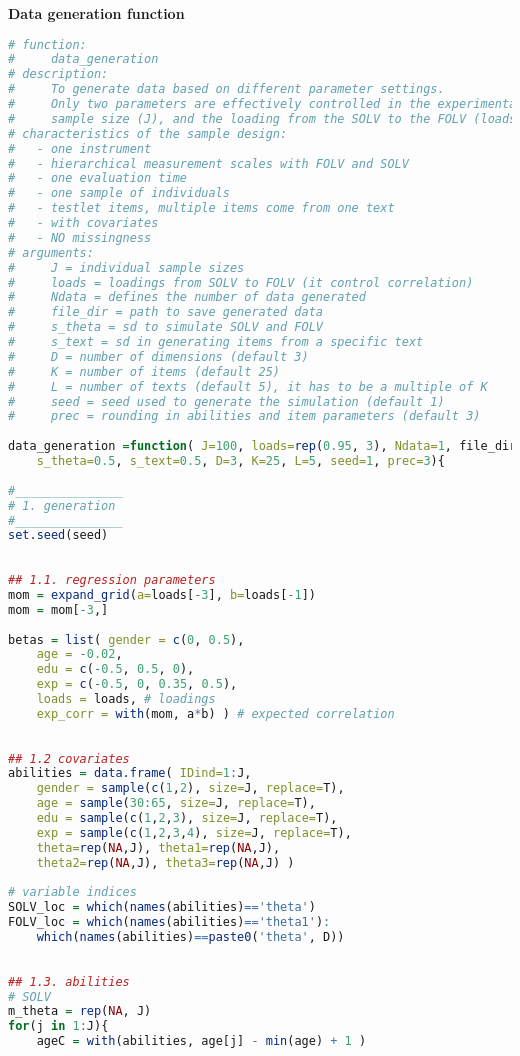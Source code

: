 \noindent \textbf{Data generation function}
%
\begin{lstlisting}[language=R]
# function:
#     data_generation
# description:  
#     To generate data based on different parameter settings.
#     Only two parameters are effectively controlled in the experimentation: 
#     sample size (J), and the loading from the SOLV to the FOLV (loads).
# characteristics of the sample design:
#   - one instrument
#   - hierarchical measurement scales with FOLV and SOLV
#   - one evaluation time
#   - one sample of individuals
#   - testlet items, multiple items come from one text
#   - with covariates
#   - NO missingness
# arguments:
#     J = individual sample sizes
#     loads = loadings from SOLV to FOLV (it control correlation)
#     Ndata = defines the number of data generated
#     file_dir = path to save generated data
#     s_theta = sd to simulate SOLV and FOLV
#     s_text = sd in generating items from a specific text
#     D = number of dimensions (default 3)
#     K = number of items (default 25)
#     L = number of texts (default 5), it has to be a multiple of K
#     seed = seed used to generate the simulation (default 1)
#     prec = rounding in abilities and item parameters (default 3)
	
data_generation =function( J=100, loads=rep(0.95, 3), Ndata=1, file_dir,
	s_theta=0.5, s_text=0.5, D=3, K=25, L=5, seed=1, prec=3){
		
#_______________
# 1. generation 
#_______________
set.seed(seed)
		
	
## 1.1. regression parameters
mom = expand_grid(a=loads[-3], b=loads[-1])
mom = mom[-3,]
		
betas = list( gender = c(0, 0.5),
	age = -0.02,
	edu = c(-0.5, 0.5, 0),
	exp = c(-0.5, 0, 0.35, 0.5),
	loads = loads, # loadings
	exp_corr = with(mom, a*b) ) # expected correlation
		
		
## 1.2 covariates
abilities = data.frame( IDind=1:J,
	gender = sample(c(1,2), size=J, replace=T),
	age = sample(30:65, size=J, replace=T),
	edu = sample(c(1,2,3), size=J, replace=T),
	exp = sample(c(1,2,3,4), size=J, replace=T),
	theta=rep(NA,J), theta1=rep(NA,J), 
	theta2=rep(NA,J), theta3=rep(NA,J) )
	
# variable indices
SOLV_loc = which(names(abilities)=='theta')
FOLV_loc = which(names(abilities)=='theta1'):
	which(names(abilities)==paste0('theta', D))
		
		
## 1.3. abilities
# SOLV
m_theta = rep(NA, J)
for(j in 1:J){
	ageC = with(abilities, age[j] - min(age) + 1 )
	

\end{lstlisting}
